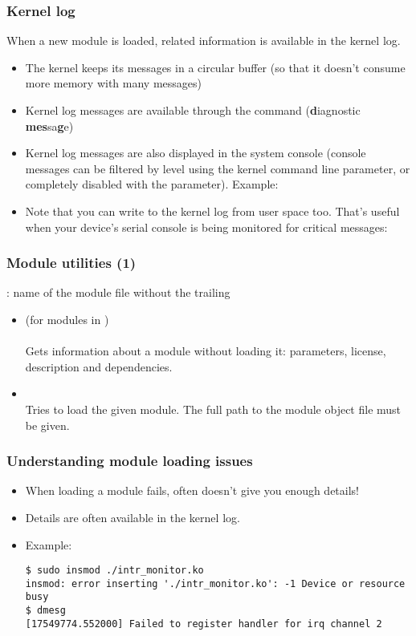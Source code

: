 \begin{frame}
  \frametitle{Kernel log}

  When a new module is loaded, related information is available in the
  kernel log.
  \begin{itemize}
  \item The kernel keeps its messages in a circular buffer (so that it
    doesn't consume more memory with many messages)
  \item Kernel log messages are available through the 
    command ({\bf d}iagnostic {\bf mes}sa{\bf g}e)
  \item Kernel log messages are also displayed in the system console
    (console messages can be filtered by level using the
     kernel command line parameter,
     or completely disabled with the
     parameter). Example:\\
  \item Note that you can write to the kernel log from user space too.
    That's useful when your device's serial console is being monitored
    for critical messages:
  \end{itemize}
\end{frame}

\begin{frame}
  \frametitle{Module utilities (1)}
  : name of the module file without the trailing \\
  \begin{itemize}
  \item {} (for modules in )\\
    \\
    Gets information about a module without loading it: parameters, license,
    description and dependencies.\\
  \item {}\\
    Tries to load the given module. The full path to the module object
    file must be given.
  \end{itemize}
\end{frame}

\begin{frame}[fragile]
  \frametitle{Understanding module loading issues}
  \begin{itemize}
  \item When loading a module fails,  often doesn't give
    you enough details!
  \item Details are often available in the kernel log.
  \item Example:\\
\scriptsize
\begin{verbatim}
$ sudo insmod ./intr_monitor.ko
insmod: error inserting './intr_monitor.ko': -1 Device or resource busy
$ dmesg
[17549774.552000] Failed to register handler for irq channel 2
\end{verbatim}
  \end{itemize}
\end{frame}

